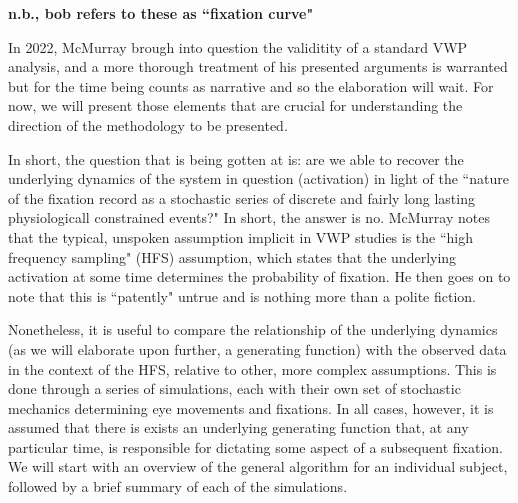 \documentclass{article}
\begin{document}

\textbf{n.b., bob refers to these as ``fixation curve"}

In 2022, McMurray brough into question the validitity of a standard VWP analysis, and a more thorough treatment of his presented arguments is warranted but for the time being counts as narrative and so the elaboration will wait. For now, we will present those elements that are crucial for understanding the direction of the methodology to be presented.

In short, the question that is being gotten at is: are we able to recover the underlying dynamics of the system in question (activation) in light of the ``nature of the fixation record as a stochastic series of discrete and fairly long lasting physiologicall constrained events?" In short, the answer is no. McMurray notes that the typical, unspoken assumption implicit in VWP studies is the ``high frequency sampling" (HFS) assumption, which states that the underlying activation at some time determines the probability of fixation. He then goes on to note that this is ``patently" untrue and is nothing more than a polite fiction.

Nonetheless, it is useful to compare the relationship of the underlying dynamics (as we will elaborate upon further, a generating function) with the observed data in the context of the HFS, relative to other, more complex assumptions. This is done through a series of simulations, each with their own set of stochastic mechanics determining eye movements and fixations. In all cases, however, it is assumed that there is exists an underlying generating function that, at any particular time, is responsible for dictating some aspect of a subsequent fixation. We will start with an overview of the general algorithm for an individual subject, followed by a brief summary of each of the simulations.
\end{document}

